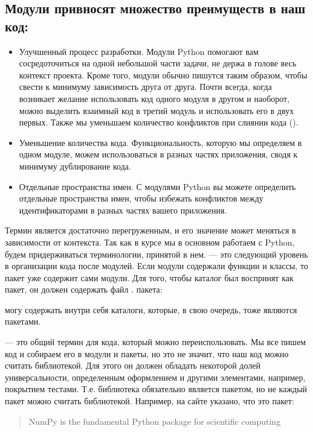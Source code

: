 \documentclass[letterpaper,10pt,russian]{sphinxmanual}
\begin{document}
\subsection{Модули привносят множество преимуществ в наш код:}
\label{\detokenize{educational_materials/terms/content:id2}}\begin{itemize}
\item {} 
\sphinxAtStartPar
Улучшенный процесс разработки. Модули Python помогают вам сосредоточиться на одной небольшой части задачи, не держа в голове весь контекст проекта. Кроме того, модули обычно пишутся таким образом, чтобы свести к минимуму зависимость друга от друга. Почти всегда, когда возникает желание использовать код одного модуля в другом и наоборот, можно выделить взаимный код в третий модуль и использовать его в двух первых. Также мы уменьшаем количество конфликтов при слиянии кода ().

\item {} 
\sphinxAtStartPar
Уменьшение количества кода. Функциональность, которую мы определяем в одном модуле, можем использоваться в разных частях приложения, сводя к минимуму дублирование кода.

\item {} 
\sphinxAtStartPar
Отдельные пространства имен. С модулями Python вы можете определить отдельные пространства имен, чтобы избежать конфликтов между идентификаторами в разных частях вашего приложения.

\end{itemize}

\sphinxAtStartPar
Термин  является достаточно перегруженным, и его значение может меняться в зависимости от контекста. Так как в курсе мы в основном работаем с Python, будем придерживаться терминологии, принятой в нем.  — это следующий уровень в организации кода после модулей. Если модули содержали функции и классы, то пакет уже содержит сами модули. Для того, чтобы каталог был воспринят как пакет, он должен содержать файл .  пакета:

\sphinxAtStartPar
{}

\sphinxAtStartPar
{} могу содержать внутри себя каталоги, которые, в свою очередь, тоже являются пакетами.

\sphinxAtStartPar
{}  — это общий термин для кода, который можно переиспользовать. Мы все пишем код и собираем его в модули и пакеты, но это не значит, что наш код можно считать библиотекой. Для этого он должен обладать некоторой долей универсальности, определенным оформлением и другими элементами, например, покрытием тестами. Т.е. библиотека обязательно является пакетом, но не каждый пакет можно считать библиотекой. Например, на сайте  указано, что это пакет:
\begin{quote}

\sphinxAtStartPar
NumPy is the fundamental Python package for scientific computing
\end{quote}
\end{document}
